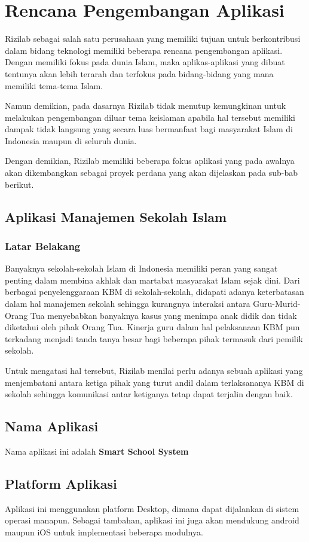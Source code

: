 \documentclass[Rizilab.tex]{subfile}
\begin{document}
  \section{Rencana Pengembangan Aplikasi}
  Rizilab sebagai salah satu perusahaan yang memiliki tujuan untuk berkontribusi dalam bidang teknologi memiliki beberapa rencana pengembangan aplikasi. Dengan memiliki fokus pada dunia Islam, maka aplikas-aplikasi yang dibuat tentunya akan lebih terarah dan terfokus pada bidang-bidang yang mana memiliki tema-tema Islam.

  Namun demikian, pada dasarnya Rizilab tidak menutup kemungkinan untuk melakukan pengembangan diluar tema keislaman apabila hal tersebut memiliki dampak tidak langsung yang secara luas bermanfaat bagi masyarakat Islam di Indonesia maupun di seluruh dunia.

  Dengan demikian, Rizilab memiliki beberapa fokus aplikasi yang pada awalnya akan dikembangkan sebagai proyek perdana yang akan dijelaskan pada sub-bab berikut.

  \subsection{Aplikasi Manajemen Sekolah Islam}
   \subsubsection{Latar Belakang}
    Banyaknya sekolah-sekolah Islam di Indonesia memiliki peran yang sangat penting dalam membina akhlak dan martabat masyarakat Islam sejak dini. Dari berbagai penyelenggaraan KBM di sekolah-sekolah, didapati adanya keterbatasan dalam hal manajemen sekolah sehingga kurangnya interaksi antara Guru-Murid-Orang Tua menyebabkan banyaknya kasus yang menimpa anak didik dan tidak diketahui oleh pihak Orang Tua. Kinerja guru dalam hal pelaksanaan KBM pun terkadang menjadi tanda tanya besar bagi beberapa pihak termasuk dari pemilik sekolah.

    Untuk mengatasi hal tersebut, Rizilab menilai perlu adanya sebuah aplikasi yang menjembatani antara ketiga pihak yang turut andil dalam terlaksananya KBM di sekolah sehingga komunikasi antar ketiganya tetap dapat terjalin dengan baik.
   \subsection{Nama Aplikasi}
    Nama aplikasi ini adalah {\bfseries Smart School System}
   \subsection{Platform Aplikasi}
    Aplikasi ini menggunakan platform Desktop, dimana dapat dijalankan di sistem operasi manapun. Sebagai tambahan, aplikasi ini juga akan mendukung android maupun iOS untuk implementasi beberapa modulnya.
\end{document}
